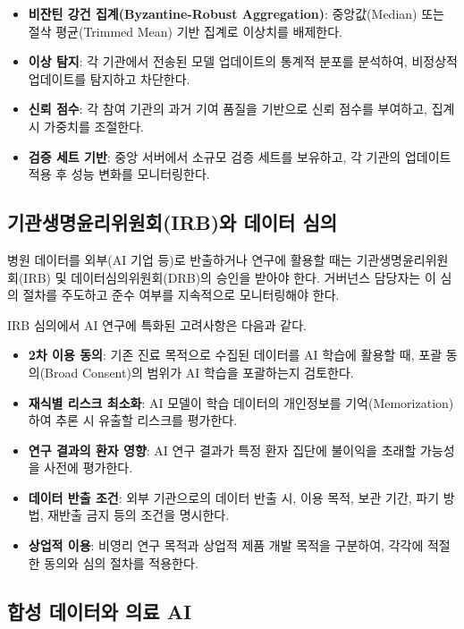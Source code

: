 \begin{itemize}
 \item \textbf{비잔틴 강건 집계(Byzantine-Robust Aggregation)}: 중앙값(Median) 또는 절삭 평균(Trimmed Mean) 기반 집계로 이상치를 배제한다.
 \item \textbf{이상 탐지}: 각 기관에서 전송된 모델 업데이트의 통계적 분포를 분석하여, 비정상적 업데이트를 탐지하고 차단한다.
 \item \textbf{신뢰 점수}: 각 참여 기관의 과거 기여 품질을 기반으로 신뢰 점수를 부여하고, 집계 시 가중치를 조절한다.
 \item \textbf{검증 세트 기반}: 중앙 서버에서 소규모 검증 세트를 보유하고, 각 기관의 업데이트 적용 후 성능 변화를 모니터링한다.
\end{itemize}

\subsection{기관생명윤리위원회(IRB)와 데이터 심의}
\label{sec:16.3.3}

병원 데이터를 외부(AI 기업 등)로 반출하거나 연구에 활용할 때는 기관생명윤리위원회(IRB) 및 데이터심의위원회(DRB)의 승인을 받아야 한다. 거버넌스 담당자는 이 심의 절차를 주도하고 준수 여부를 지속적으로 모니터링해야 한다.

IRB 심의에서 AI 연구에 특화된 고려사항은 다음과 같다.
\begin{itemize}
 \item \textbf{2차 이용 동의}: 기존 진료 목적으로 수집된 데이터를 AI 학습에 활용할 때, 포괄 동의(Broad Consent)의 범위가 AI 학습을 포괄하는지 검토한다.
 \item \textbf{재식별 리스크 최소화}: AI 모델이 학습 데이터의 개인정보를 기억(Memorization)하여 추론 시 유출할 리스크를 평가한다.
 \item \textbf{연구 결과의 환자 영향}: AI 연구 결과가 특정 환자 집단에 불이익을 초래할 가능성을 사전에 평가한다.
 \item \textbf{데이터 반출 조건}: 외부 기관으로의 데이터 반출 시, 이용 목적, 보관 기간, 파기 방법, 재반출 금지 등의 조건을 명시한다.
 \item \textbf{상업적 이용}: 비영리 연구 목적과 상업적 제품 개발 목적을 구분하여, 각각에 적절한 동의와 심의 절차를 적용한다.
\end{itemize}

\subsection{합성 데이터와 의료 AI}
\label{sec:16.3.4}

